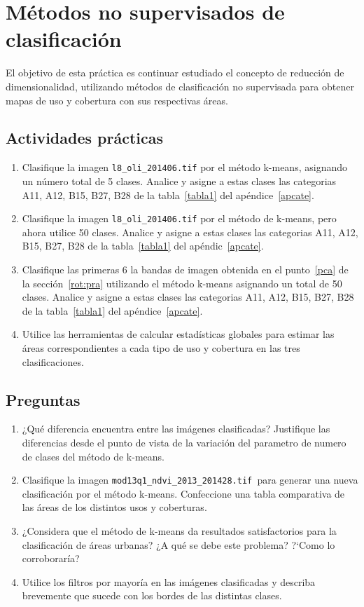\documentclass[hidelinks,12pt]{article}
\begin{document}
\section{Métodos no supervisados de clasificación}

El objetivo de esta práctica es continuar estudiado el concepto de reducción de
dimensionalidad, utilizando métodos de clasificación no supervisada para obtener
mapas de uso y cobertura con sus respectivas áreas.

\subsection{Actividades pr\'acticas}
\begin{enumerate}
    \item Clasifique la imagen \texttt{l8\_oli\_2014\-06.tif} por el método 
        k-means, asignando un número total
        de 5 clases. Analice y asigne a estas clases las categorias A11, A12,
        B15, B27, B28 de la tabla~\ref{tabla1} del ap\'endice~\ref{apcate}.
    \item Clasifique la imagen \texttt{l8\_oli\_2014\-06.tif} por el método de 
        k-means, pero ahora utilice 50
        clases. Analice y asigne a estas clases las categorias A11, A12,
        B15, B27, B28 de la tabla~\ref{tabla1} del ap\'endic~\ref{apcate}.
    \item Clasifique las primeras 6 la bandas de imagen obtenida en el punto~\ref{pca} 
        de la secci\'on~\ref{rot:pra} utilizando el m\'etodo k-means
        asignando un total de 50 clases. Analice y asigne a estas clases las categorias A11, A12,
        B15, B27, B28 de la tabla~\ref{tabla1} del ap\'endice~\ref{apcate}.
    \item Utilice las herramientas de calcular estadísticas globales para
        estimar las áreas correspondientes a cada tipo de uso y cobertura en
        las tres clasificaciones.
\end{enumerate}

\subsection{Preguntas}
\begin{enumerate}
    \item ¿Qué diferencia encuentra entre las imágenes clasificadas? Justifique
        las diferencias desde el punto de vista de la variaci\'on del parametro
        de numero de clases del método de k-means.
    \item Clasifique la imagen  \texttt{mod13q1\_ndvi\_2013\_2014\-28.tif }para 
        generar una nueva clasificación por el método k-means. Confeccione una 
        tabla comparativa de las áreas de los distintos usos y coberturas.
    \item ¿Considera que el método de k-means da resultados satisfactorios para
        la clasificación de áreas urbanas? ¿A qué se debe este problema? ?`Como
        lo corroborar\'ia?
    \item Utilice los filtros por mayoría en las imágenes clasificadas y
        describa brevemente que sucede con los bordes de las distintas clases.
\end{enumerate}
\end{document}
